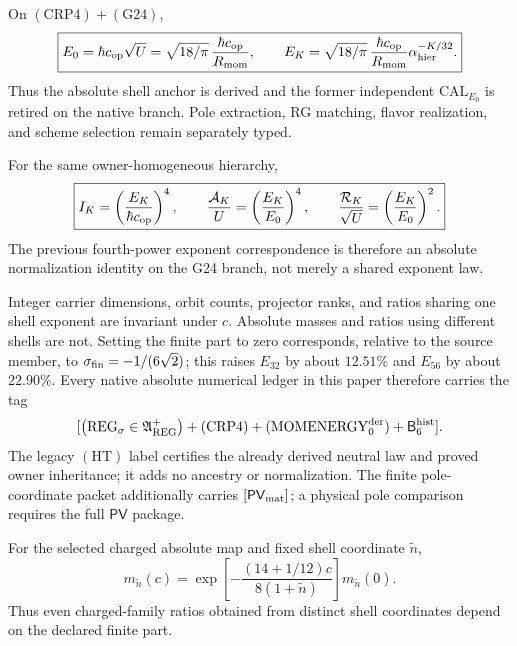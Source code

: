 \documentclass[12pt,a4paper]{article}
\newcommand{\BridgeRaw}{\mathsf B_6^{\rm hist}}
\begin{document}
\begin{theorem}
\label{p6:thm:momentum-rooted-shell-normalization}
On \((\mathrm{CRP4})+(\mathrm{G24})\),
\[
 \boxed{E_0=\hbar c_{\rm op}\sqrt U
 =\sqrt{18/\pi}\,\frac{\hbar c_{\rm op}}{R_{\rm mom}},\qquad
 E_K=\sqrt{18/\pi}\,\frac{\hbar c_{\rm op}}{R_{\rm mom}}
 \alpha_{\rm hier}^{-K/32}.}
\]
Thus the absolute shell anchor is derived and the former independent
\(\mathrm{CAL}_{E_0}\) is retired on the native branch.  Pole extraction,
RG matching, flavor realization, and scheme selection remain separately typed.
\end{theorem}

\begin{corollary}
\label{p6:cor:exact-energy-action-ladder-normalization}
For the same owner-homogeneous hierarchy,
\[
 \boxed{I_K=\left(\frac{E_K}{\hbar c_{\rm op}}\right)^4,\qquad
 \frac{\mathcal A_K}{U}=\left(\frac{E_K}{E_0}\right)^4,\qquad
 \frac{\mathcal R_K}{\sqrt U}=\left(\frac{E_K}{E_0}\right)^2.}
\]
The previous fourth-power exponent correspondence is therefore an absolute
normalization identity on the G24 branch, not merely a shared exponent law.
\end{corollary}

\begin{corollary}
\label{p6:cor:absolute-ledger-status}
Integer carrier dimensions, orbit counts, projector ranks, and ratios sharing
one shell exponent are invariant under \(c\).  Absolute masses and ratios
using different shells are not.  Setting the finite part to zero corresponds, relative to the source member,
to \(\sigma_{\rm fin}=-1/(6\sqrt2)\); this raises \(E_{32}\) by about
\(12.51\%\) and \(E_{56}\) by about \(22.90\%\).  Every native absolute
numerical ledger in this paper therefore carries the tag
\[
[\bigl(\mathrm{REG}_{\sigma}\in\mathfrak A_{\rm REG}^{+}\bigr)
 +(\mathrm{CRP4})+(\mathrm{MOMENERGY}_{0}^{\rm der})+\BridgeRaw].
\]
The legacy \((\mathrm{HT})\) label certifies the already derived neutral law
and proved owner inheritance; it adds no ancestry or normalization.
The finite pole-coordinate packet additionally carries
\([\mathsf{PV}_{\rm mat}]\); a physical pole comparison requires the full
\(\mathsf{PV}\) package.
\end{corollary}

\begin{corollary}
\label{p6:cor:charged-map-covariance}
For the selected charged absolute map and fixed shell coordinate
\(\widetilde n\),
\[
m_{\widetilde n}(c)
=
\exp\left[
-\frac{(14+1/12)c}{8(1+\widetilde n)}
\right]m_{\widetilde n}(0).
\]
Thus even charged-family ratios obtained from distinct shell coordinates
depend on the declared finite part.
\end{corollary}
\end{document}
